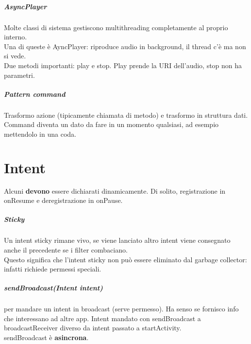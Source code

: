 \documentclass[10pt]{book}
\begin{document}
\paragraph{AsyncPlayer} Molte classi di sistema gestiscono multithreading completamente al proprio interno.\\
Una di queste è AyncPlayer: riproduce audio in background, il thread c'è ma non si vede.\\
Due metodi importanti: play e stop. Play prende la URI dell'audio, stop non ha parametri.
\paragraph{Pattern command} Trasformo azione (tipicamente chiamata di metodo) e trasformo in struttura dati.\\
Command diventa un dato da fare in un momento qualsiasi, ad esempio mettendolo in una coda.

\chapter{Intent}
Alcuni \textbf{devono} essere dichiarati dinamicamente. Di solito, registrazione in onResume e deregistrazione in onPause.
\paragraph{Sticky} Un intent sticky rimane vivo, se viene lanciato altro intent viene consegnato anche il precedente se i filter combaciano.\\
Questo significa che l'intent sticky non può essere eliminato dal garbage collector: infatti richiede permessi speciali.
\paragraph{sendBroadcast(Intent intent)} per mandare un intent in broadcast (serve permesso). Ha senso se fornisco info che interessano ad altre app. Intent mandato con sendBroadcast a broadcastReceiver diverso da intent passato a startActivity.\\
sendBroadcast è \textbf{asincrona}.
\end{document}
